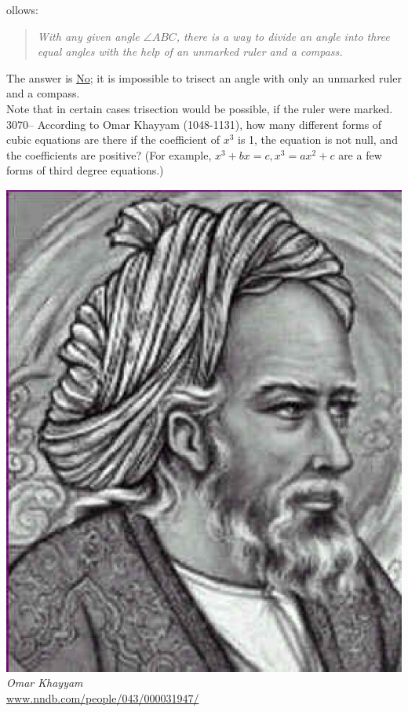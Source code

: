 \documentclass[letterpaper, 12pt]{article}
\begin{document}
ollows:\\
\begin{quote}
\emph{With any given angle $\angle ABC$, there is a way to divide an angle into three equal angles with the help of an unmarked ruler and a compass.}\\
\end{quote}
The answer is \underline{No}; it is impossible to trisect an angle with only an unmarked ruler and a compass.\\
Note that in certain cases trisection would be possible, if the ruler were marked.\\



3070-- According to Omar Khayyam (1048-1131), how many different forms of cubic equations are there if the coefficient of $x^{3}$ is 1, the equation is not null, and the coefficients are positive? (For example, $x^{3} + bx = c, x^{3} = ax^{2} + c$ are a few forms of third degree equations.)
\begin{center}
\includegraphics[scale=0.3]{Omar_Khayyam.eps}\\
\emph{{\small Omar Khayyam}}\\
\href{http://www.nndb.com/people/043/000031947/}{www.nndb.com/people/043/000031947/}\\
\end{center}
\end{document}
